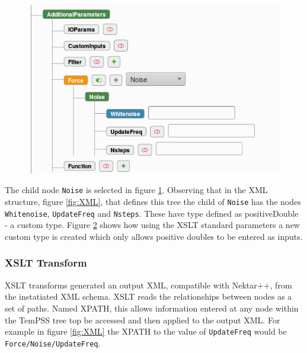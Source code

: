 \documentclass[11pt, a4paper]{report}
\begin{document}
\begin{figure}[htb!]
 \centering
 \includegraphics[width=.75\linewidth,  clip=true, trim = 0cm 0cm 0cm 0cm]{force_tree}
 \label{fig:force_tree}
\end{figure}

The child node \texttt{Noise} is selected in figure \ref{fig:force_tree}. Observing that in the XML structure, figure \ref{fig:XML}, that defines this tree the child of \texttt{Noise} has the nodes \texttt{Whitenoise}, \texttt{UpdateFreq} and \texttt{Nsteps}. These have type defined as positiveDouble - a custom type. Figure \ref{fig:custom_type} shows how using the XSLT standard parameters a new custom type is created which only allows positive doubles to be entered as inputs.

\begin{figure}[htb!]
 \centering
 
 \label{fig:custom_type}
\end{figure}

\subsubsection{XSLT Transform}
XSLT transforms generated an output XML, compatible with Nektar++, from the instatiated XML schema. XSLT reads the relationships between nodes as a set of paths. Named XPATH, this allows information entered at any node within the TemPSS tree top be accessed and then applied to the output XML. For example in figure \ref{fig:XML} the XPATH to the value of \texttt{UpdateFreq} would be \texttt{Force/Noise/UpdateFreq}.

\begin{figure}[htb!]
 \centering
 
 \label{fig:xsl_parent}
\end{figure}
\end{document}
